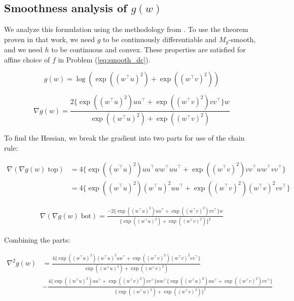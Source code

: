 \documentclass[11pt]{article}
\begin{document}
\subsection{Smoothness analysis of $g(w)$}

We analyze this formulation using the methodology from \cite{khamaru_convergence_2018}. To use the theorem proven in that work, we need $g$ to be continuously differentiable and $M_g$-smooth, and we need $h$ to be continuous and convex. These properties are satisfied for affine choice of $f$ in Problem (\ref{eq:smooth_dc}).

\begin{equation}
    g(w) = \log( \exp((w^{\top}u)^2) + \exp((w^{\top}v)^2) )
\end{equation}

\begin{equation}
    \nabla g(w) 
    = \frac{ 2 \{ \exp((w^{\top}u)^2)uu^{\top} + \exp((w^{\top}v)^2)vv^{\top}  \} w}{ \exp((w^{\top}u)^2) + \exp((w^{\top}v)^2) }
\end{equation}

To find the Hessian, we break the gradient into two parts for use of the chain rule:

\begin{align*}
    \nabla (\nabla g(w) \; \textrm{top}) 
    &= 4 \{ \exp((w^{\top}u)^2)uu^{\top}ww^{\top}uu^{\top} + \exp((w^{\top}v)^2)vv^{\top}ww^{\top}vv^{\top} \} \\
    &= 4 \{ \exp((w^{\top}u)^2)(w^{\top}u)^2 uu^{\top} + \exp((w^{\top}v)^2)(w^{\top}v)^2 vv^{\top} \}
\end{align*}

\begin{align*}
    \nabla (\nabla g(w) \; \textrm{bot}) = \frac{ -2 \{ \exp((w^{\top}u)^2)uu^{\top} + \exp((w^{\top}v)^2)vv^{\top} \} w }{ \{ \exp((w^{\top}u)^2) + \exp((w^{\top}v)^2) \}^2 }
\end{align*}

Combining the parts:

\begin{align*}
    \nabla^2 g(w) &= 
    \frac{ 4 \{ \exp((w^{\top}u)^2)(w^{\top}u)^2 uu^{\top} + \exp((w^{\top}v)^2)(w^{\top}v)^2 vv^{\top} \} }{ \exp((w^{\top}u)^2) + \exp((w^{\top}v)^2)  } \\
    &- \frac{ 4 \{ \exp((w^{\top}u)^2)uu^{\top} + \exp((w^{\top}v)^2)vv^{\top}  \} ww^{\top} \{ \exp((w^{\top}u)^2)uu^{\top} + \exp((w^{\top}v)^2)vv^{\top}  \} }{ \{ \exp((w^{\top}u)^2) + \exp((w^{\top}v)^2) \}^2 }
\end{align*}
\end{document}
